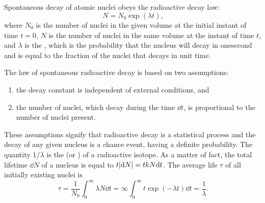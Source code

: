 \subsection{}\label{42.4.4} Spontaneous decay of atomic nuclei obeys the radioactive decay law:
\begin{equation*}%
N = N_{0} \exp (\lambda t),
\end{equation*}
where $N_{0}$ is the number of nuclei in the given volume at the initial instant of time $t = 0$, $N$ is the number of nuclei in the same volume at the instant of time $t$, and $\lambda$ is the , which is the probability that the nucleus will decay in onesecond and is equal to the fraction of the nuclei that decays in unit time.

The law of spontaneous radioactive decay is based on two assump­tions: 
\begin{enumerate}[label = \arabic*.]
\item the decay constant is independent of external conditions, and 
\item the number of nuclei, which decay during the time $\dd t$, is proportional to the number of nuclei present. 
\end{enumerate}
These assumptions signify that radioactive decay is a statistical process and the decay of any given nucleus is a chance event, having a definite probability. The quantity $1/\lambda$ is the  (or ) of a radioactive isotope. As a matter of fact, the total lifetime $\dd N$ of a nucleus is equal to $t \abs{\dd N} = t k N \dd t$. The average life $\tau$ of all initially existing nuclei is
\begin{equation*}%
\tau = \frac{1}{N_{0}} \int_{0}^{\infty} \lambda N \dd t = \infty \int_{0}^{\infty} t \exp (- \lambda t) \dd t = \frac{1}{\lambda}.
\end{equation*}

